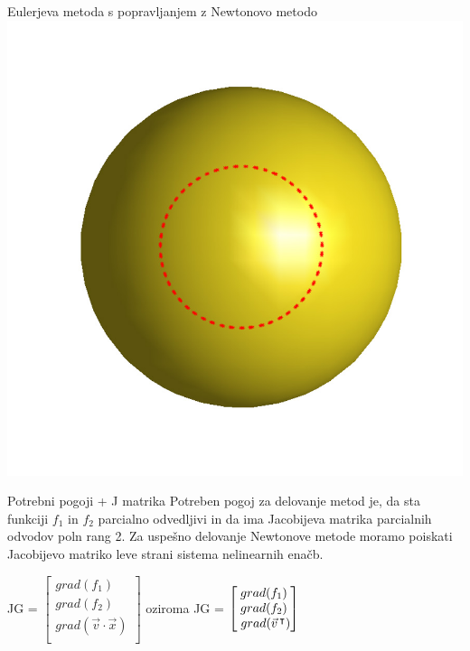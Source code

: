 \documentclass{beamer}
\begin{document}
\begin{frame}{Eulerjeva metoda s popravljanjem z Newtonovo metodo}
	\includegraphics[scale=0.2]{eul3_newt}
	
\end{frame}

\begin{frame}{Potrebni pogoji + J matrika}
	Potreben pogoj za delovanje metod je, da sta funkciji $f_{1}$ in $f_{2}$ parcialno odvedljivi in da ima Jacobijeva matrika parcialnih odvodov poln rang 2. Za uspešno delovanje Newtonove metode moramo poiskati Jacobijevo matriko leve strani sistema nelinearnih enačb.
	
	\begin{center}
		JG = $\begin{bmatrix}
		grad(f_{1}) \\
		grad(f_{2}) \\
		grad(\vec{v} \cdot \vec{x}) \\
		\end{bmatrix}$
		oziroma
		JG = $\begin{bmatrix}
		grad(f_{1}) \\
		grad(f_{2}) \\
		\hspace{1mm}grad(\vec{v}\hspace{0.5mm}^\intercal) \\
		\end{bmatrix}$
	\end{center}
\end{frame}
\end{document}
